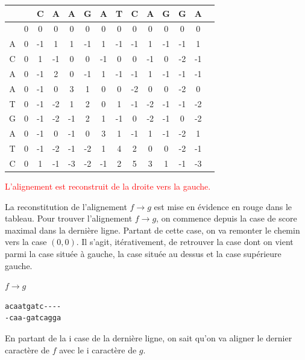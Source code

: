 \documentclass{article}
\begin{document}
\begin{table}[h]
	\centering
	\begin{tabular}{|c|c|c|c|c|c|c|c|c|c|c|c|c|c|}
		\hline
		&& C & A & A & G & A & T & C & A & G & G & A\\		
		\hline
		& 0 & 0 & 0 & 0 & 0 & 0 & 0 & 0 & 0 & 0 & \cellcolor{lightgreen}0 & 0  \\
		\hline 
		A&\cellcolor{lightred}0 & -1 & 1 & 1 & -1 & 1 & -1 & -1 & 1 & -1 & -1 &\cellcolor{lightgreen}1 \\
		\hline 
		C&0 & \cellcolor{lightred}1 & -1 & 0 & 0 & -1 & 0 & 0 & -1 & 0 & -2 & -1 \\
		\hline 
		A&0 & -1 & \cellcolor{lightred}2 & 0 & -1 & 1 & -1 & -1 & 1 & -1 & -1 & -1  \\
		\hline 
		A&0 & -1 & 0 & \cellcolor{lightred}3 & 1 & 0 & 0 & -2 & 0 & 0 & -2 & 0 \\
		\hline 
		T&0 & -1 & -2 & \cellcolor{lightred}1 & 2 & 0 & 1 & -1 & -2 & -1 & -1 & -2  \\
		\hline 
		G&0 & -1 & -2 & -1 & \cellcolor{lightred}2 & 1 & -1 & 0 & -2 & -1 & 0 & -2  \\
		\hline 
		A&0 & -1 & 0 & -1 & 0 & \cellcolor{lightred}3 & 1 & -1 & 1 & -1 & -2 & 1  \\
		\hline 
		T&0 & -1 & -2 & -1 & -2 & 1 & \cellcolor{lightred}4 & 2 & 0 & 0 & -2 & -1  \\
		\hline 
		C&0 & 1 & -1 & -3 & -2 & -1 & 2 & \cellcolor{lightred}5 & 3 & 1 & -1 & -3  \\
		\hline 
	\end{tabular}
\end{table}

\textcolor{red}{L'alignement est reconstruit de la droite vers la gauche.}

La reconstitution de l'alignement $f \to g$ est mise en évidence en rouge dans le tableau. Pour trouver l'alignement $f \to g$, on  commence depuis la case de score maximal dans la dernière ligne. 
Partant de cette case, on va remonter le chemin vers la case $(0,0)$. Il s'agit, itérativement, de retrouver la case dont on vient parmi la case située à gauche, la case située au dessus et la case supérieure gauche.



$f \to g$
\begin{verbatim}
acaatgatc----
-caa-gatcagga
\end{verbatim}
En partant de la i case de la dernière ligne, on sait qu'on va aligner le dernier caractère de $f$ avec le i caractère de $g$. 
\end{document}
